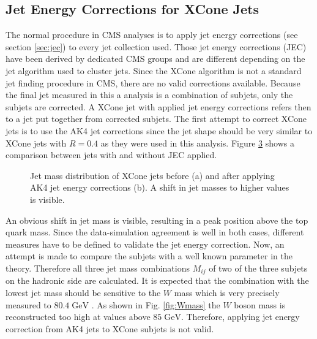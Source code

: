 \subsection{Jet Energy Corrections for XCone Jets} 
	The normal procedure in CMS analyses is to apply jet energy corrections (see section \ref{sec:jec}) to every jet collection used. Those jet energy corrections (JEC) have been derived by dedicated CMS groups and are different depending on the jet algorithm used to cluster jets. Since the XCone algorithm is not a standard jet finding procedure in CMS, there are no valid corrections available. Because the final jet measured in this a analysis is a combination of subjets, only the subjets are corrected. A XCone jet with applied jet energy corrections refers then to a jet put together from corrected subjets. The first attempt to correct XCone jets is to use the AK4 jet corrections since the jet shape should be very similar to XCone jets with $R=0.4$ as they were used in this analysis. Figure \ref{fig:MJet_jec} shows a comparison between jets with and without JEC applied. 
 	\begin{figure}[tb]
 		\begin{subfigure}{.5\textwidth}
 		\centering
 		\caption{}
 		\label{fig:MJet_jec1}
 		\end{subfigure}
 		\begin{subfigure}{.5\textwidth}
 		\centering
 		\caption{}
 		\label{fig:MJet_jec2}
 		\end{subfigure}
 		\caption{Jet mass distribution of XCone jets before (a) and after applying AK4 jet energy corrections (b). A shift in jet masses to higher values is visible.}
 		\label{fig:MJet_jec}
 	\end{figure}	
 	An obvious shift in jet mass is visible, resulting in a peak position above the top quark mass. Since the data-simulation agreement is well in both cases, different measures have to be defined to validate the jet energy correction. Now, an attempt is made to compare the subjets with a well known parameter in the theory. Therefore all three jet mass combinations $M_{ij}$ of two of the three subjets on the hadronic side are calculated. It is expected that the combination with the lowest jet mass should be sensitive to the $W$ mass which is very precisely measured to $80.4\;\text{GeV}$ \cite{Wmass}. As shown in Fig. \ref{fig:Wmass} the $W$ boson mass is reconstructed too high at values above $85\;\text{GeV}$. Therefore, applying jet energy correction from AK4 jets to XCone subjets is not valid.
